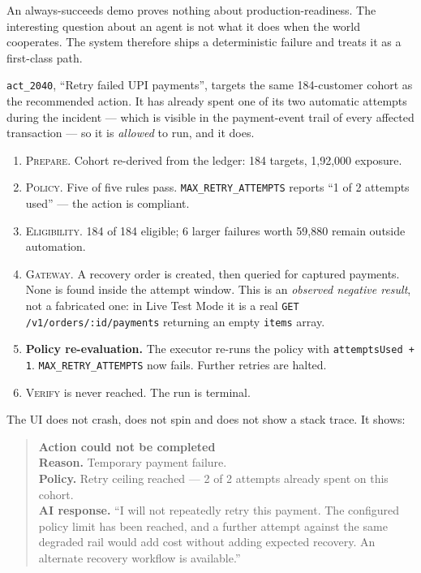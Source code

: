\documentclass[10pt,twocolumn,a4paper]{article}
\newcommand{\rs}{\rupee}%
\newcommand{\rs}{\textrm{INR}\,}%
\newcommand{\code}[1]{\texttt{\small #1}}
\newcommand{\stage}[1]{\textsc{#1}}
\begin{document}
An always-succeeds demo proves nothing about production-readiness. The
interesting question about an agent is not what it does when the world
cooperates. The system therefore ships a deterministic failure and treats it as a
first-class path.

\code{act\_2040}, ``Retry failed UPI payments'', targets the same 184-customer
cohort as the recommended action. It has already spent one of its two automatic
attempts during the incident --- which is visible in the payment-event trail of
every affected transaction --- so it is \emph{allowed} to run, and it does.

\begin{enumerate}
  \item \stage{Prepare}. Cohort re-derived from the ledger: 184 targets,
    \rs{}1{,}92{,}000 exposure.
  \item \stage{Policy}. Five of five rules pass. \code{MAX\_RETRY\_ATTEMPTS}
    reports ``1 of 2 attempts used'' --- the action is compliant.
  \item \stage{Eligibility}. 184 of 184 eligible; 6 larger failures worth
    \rs{}59{,}880 remain outside automation.
  \item \stage{Gateway}. A recovery order is created, then queried for captured
    payments. None is found inside the attempt window. This is an
    \emph{observed negative result}, not a fabricated one: in Live Test Mode it
    is a real \code{GET /v1/orders/:id/payments} returning an empty
    \code{items} array.
  \item \textbf{Policy re-evaluation.} The executor re-runs the policy with
    \code{attemptsUsed + 1}. \code{MAX\_RETRY\_ATTEMPTS} now fails. Further
    retries are halted.
  \item \stage{Verify} is never reached. The run is terminal.
\end{enumerate}

The UI does not crash, does not spin and does not show a stack trace. It shows:

\begin{quote}\small
\textbf{Action could not be completed}\\[2pt]
\textbf{Reason.} Temporary payment failure.\\
\textbf{Policy.} Retry ceiling reached --- 2 of 2 attempts already spent on this
cohort.\\
\textbf{AI response.} ``I will not repeatedly retry this payment. The configured
policy limit has been reached, and a further attempt against the same degraded
rail would add cost without adding expected recovery. An alternate recovery
workflow is available.''
\end{quote}
\end{document}
